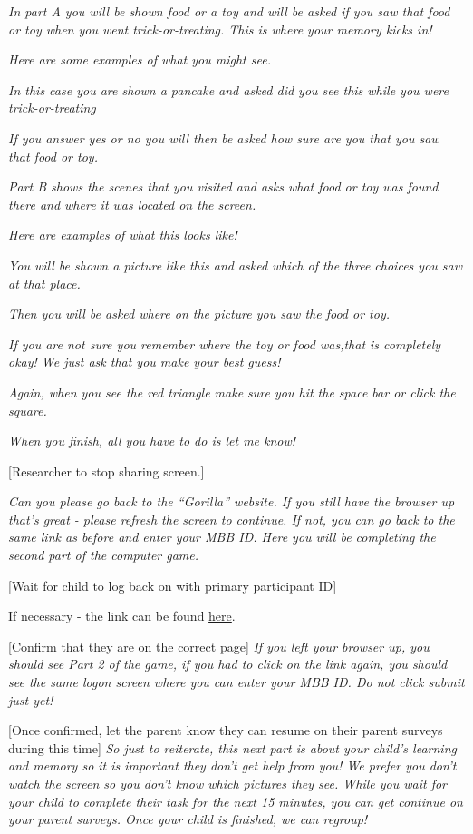\documentclass[
]{book}
\begin{document}
\emph{In part A you will be shown food or a toy and will be asked if you saw that food or toy when you went trick-or-treating. This is where your memory kicks in!}

\emph{Here are some examples of what you might see.}

\emph{In this case you are shown a pancake and asked did you see this while you were trick-or-treating}

\emph{If you answer yes or no you will then be asked how sure are you that you saw that food or toy.}

\emph{Part B shows the scenes that you visited and asks what food or toy was found there and where it was located on the screen.}

\emph{Here are examples of what this looks like!}

\emph{You will be shown a picture like this and asked which of the three choices you saw at that place.}

\emph{Then you will be asked where on the picture you saw the food or toy.}

\emph{If you are not sure you remember where the toy or food was,that is completely okay! We just ask that you make your best guess!}

\emph{Again, when you see the red triangle make sure you hit the space bar or click the square.}

\emph{When you finish, all you have to do is let me know!}

{[}Researcher to stop sharing screen.{]}

\emph{Can you please go back to the ``Gorilla'' website. If you still have the browser up that's great - please refresh the screen to continue. If not, you can go back to the same link as before and enter your MBB ID. Here you will be completing the second part of the computer game.}

{[}Wait for child to log back on with primary participant ID{]}

If necessary - the link can be found \href{https://research.sc/participant/login/39409/publicid}{here}.

{[}Confirm that they are on the correct page{]} \emph{If you left your browser up, you should see Part 2 of the game, if you had to click on the link again, you should see the same logon screen where you can enter your MBB ID. Do not click submit just yet!}

{[}Once confirmed, let the parent know they can resume on their parent surveys during this time{]} \emph{So just to reiterate, this next part is about your child's learning and memory so it is important they don't get help from you! We prefer you don't watch the screen so you don't know which pictures they see. While you wait for your child to complete their task for the next 15 minutes, you can get continue on your parent surveys. Once your child is finished, we can regroup!}
\end{document}
